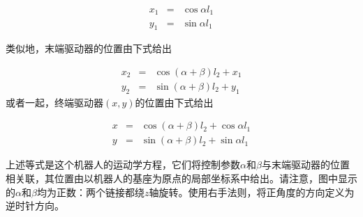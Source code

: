 \begin{eqnarray}\label{eq:cosxl1}
x_1 &=&\cos \alpha l_1\\
y_1 &=&\sin \alpha l_1
\end{eqnarray}

类似地，末端驱动器的位置由下式给出

\begin{eqnarray}
x_2&=&\cos(\alpha+\beta)l_2+x_1\\
y_2&=&\sin(\alpha+\beta)l_2+y_1
\end{eqnarray}
%
或者一起，终端驱动器$(x, y)$的位置由下式给出

\begin{eqnarray}\label{eq:cosx}
x&=&\cos(\alpha+\beta)l_2+\cos\alpha l_1\\
y&=&\sin(\alpha+\beta)l_2+\sin\alpha l_1
\end{eqnarray}


上述等式是这个机器人的运动学方程，它们将控制参数$\alpha$和$\beta$与末端驱动器的位置相关联，其位置由以机器人的基座为原点的局部坐标系中给出。请注意，图中显示的$\alpha$和$\beta$均为正数：两个链接都绕$z$轴旋转。使用右手法则，将正角度的方向定义为逆时针方向。



